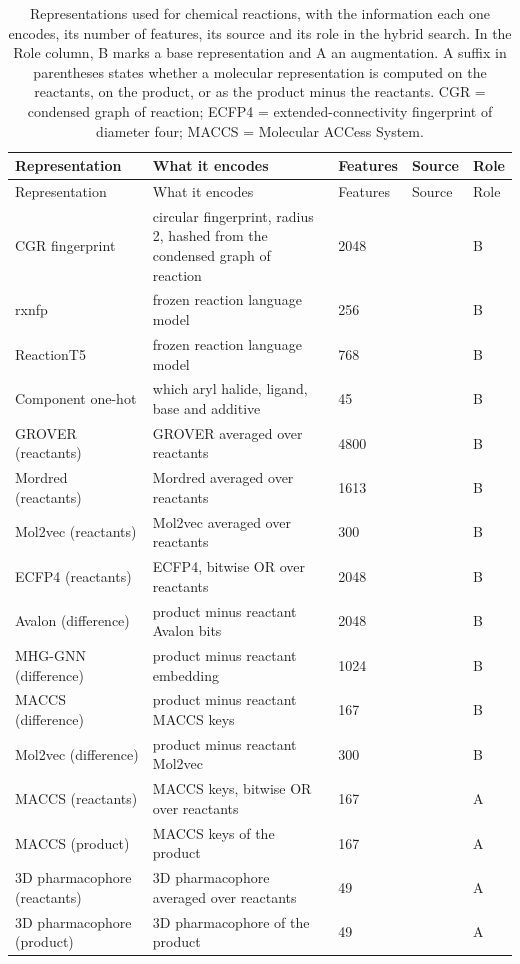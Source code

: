 \begin{longtable}{P{3.0cm}P{5.0cm}P{1.5cm}P{1.5cm}P{1.4cm}}
\caption[Representations used for chemical reactions.]{Representations used for chemical reactions, with the information each one encodes, its number of features, its source and its role in the hybrid search. In the Role column, B marks a base representation and A an augmentation. A suffix in parentheses states whether a molecular representation is computed on the reactants, on the product, or as the product minus the reactants. CGR = condensed graph of reaction; ECFP4 = extended-connectivity fingerprint of diameter four; MACCS = Molecular ACCess System.}\label{tab:reps_reactions}\\
\toprule
Representation & What it encodes & Features & Source & Role \\
\midrule
\endfirsthead
\toprule
Representation & What it encodes & Features & Source & Role \\
\midrule
\endhead
\bottomrule
\endfoot
CGR fingerprint & circular fingerprint, radius 2, hashed from the condensed graph of reaction & 2048 & \citep{Hoonakker2011} & B \\
rxnfp & frozen reaction language model & 256 & \citep{Schwaller2021rxnfp} & B \\
ReactionT5 & frozen reaction language model & 768 & \citep{Sagawa2023ReactionT5} & B \\
Component one-hot & which aryl halide, ligand, base and additive & 45 & \citep{Ahneman2018} & B \\
GROVER (reactants) & GROVER averaged over reactants & 4800 & \citep{Rong2020GROVER} & B \\
Mordred (reactants) & Mordred averaged over reactants & 1613 & \citep{Moriwaki2018} & B \\
Mol2vec (reactants) & Mol2vec averaged over reactants & 300 & \citep{Jaeger2018} & B \\
ECFP4 (reactants) & ECFP4, bitwise OR over reactants & 2048 & \citep{rogers2010} & B \\
Avalon (difference) & product minus reactant Avalon bits & 2048 & \citep{Gedeck2006} & B \\
MHG-GNN (difference) & product minus reactant embedding & 1024 & \citep{kishimoto2023} & B \\
MACCS (difference) & product minus reactant MACCS keys & 167 & \citep{Durant2002} & B \\
Mol2vec (difference) & product minus reactant Mol2vec & 300 & \citep{Jaeger2018} & B \\
MACCS (reactants) & MACCS keys, bitwise OR over reactants & 167 & \citep{Durant2002} & A \\
MACCS (product) & MACCS keys of the product & 167 & \citep{Durant2002} & A \\
3D pharmacophore (reactants) & 3D pharmacophore averaged over reactants & 49 & \citep{rdkit} & A \\
3D pharmacophore (product) & 3D pharmacophore of the product & 49 & \citep{rdkit} & A \\
\end{longtable}

